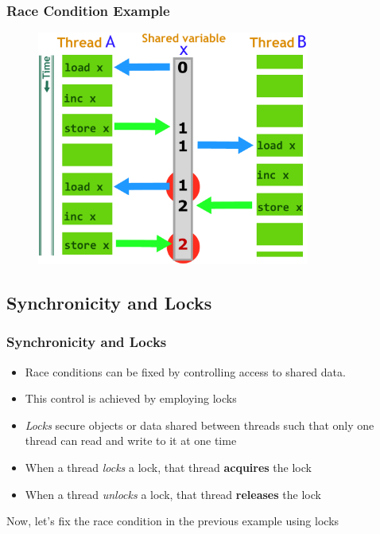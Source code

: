 \documentclass{beamer}
\newcommand{\linespace}{\vskip 0.25cm}
\begin{document}
\begin{frame}
\frametitle{Race Condition Example}
	\begin{figure}
		\includegraphics[width=0.8\textwidth]{Illustrations/RaceCondition}
		\label{fig:racecondition}
	\end{figure}

\end{frame}

\subsection[Locks]{Synchronicity and Locks}


\begin{frame}
\frametitle{Synchronicity and Locks}

\begin{itemize}
	\item Race conditions can be fixed by controlling access to shared data.
	\item This control is achieved by employing locks
	
	\linespace
	
	\item \emph{Locks} secure objects or data shared between threads such that only one thread can read and write to it at one time

	\linespace

	\item When a thread \emph{locks} a lock, that thread \textbf{acquires} the lock
	\item When a thread \emph{unlocks} a lock, that thread \textbf{releases} the lock
\end{itemize}

Now, let's fix the race condition in the previous example using locks

\end{frame}
\end{document}
